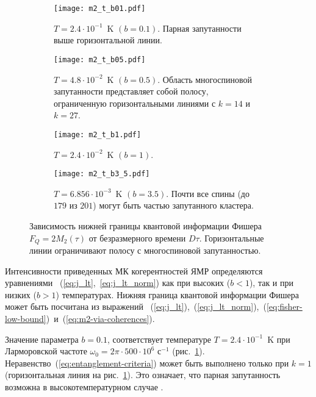 \begin{figure}[H]
  \centering
  \begin{subfigure}[t]{0.4\textwidth}
    \texttt{[image: m2\_t\_b01.pdf]}
    \caption{
      ${T=2.4\cdot10^{-1}}$~K $(b=0.1)$.
      Парная запутанности выше горизонтальной линии.
    }
    \label{fig:m2_t_b01}
  \end{subfigure}
  \hfill
  \begin{subfigure}[t]{0.4\textwidth}
    \texttt{[image: m2\_t\_b05.pdf]}
    \caption{
      ${T=4.8\cdot10^{-2}}$~K $(b=0.5)$.
      Область многоспиновой запутанности представляет собой полосу, ограниченную горизонтальными линиями с $k=14$ и $k=27$.
      }
    \label{fig:m2_t_b05}
  \end{subfigure}
  \hfill
  \begin{subfigure}[t]{0.4\textwidth}
    \texttt{[image: m2\_t\_b1.pdf]}
    \caption{
      ${T=2.4\cdot10^{-2}}$~K $(b=1)$.
    }
    \label{fig:m2_t_b1}
  \end{subfigure}
  \hfill
  \begin{subfigure}[t]{0.4\textwidth}
    \texttt{[image: m2\_t\_b3\_5.pdf]}
    \caption{
      ${T=6.856\cdot10^{-3}}$~K $(b=3.5)$.
      Почти все спины (до $179$ из $201$) могут быть частью запутанного кластера.
    }
  \label{fig:m2_t_b3.5}
  \end{subfigure}
  \caption{
    Зависимость нижней границы квантовой информации Фишера $F_Q = 2M_2(\tau)$ от безразмерного времени $D\tau$.
    Горизонтальные линии ограничивают полосу с многоспиновой запутанностью.
  }
\end{figure}

Интенсивности приведенных МК когерентностей  ЯМР определяются уравнениями ~(\ref{eq:j_lt},~\ref{eq:j_lt_norm}) как при высоких ($b < 1$), так и при низких ($b > 1$) температурах.
Нижняя граница квантовой информации Фишера может быть посчитана из выражений
~(\ref{eq:j_lt}),~(\ref{eq:j_lt_norm}),~(\ref{eq:fisher-low-bound})~и~(\ref{eq:m2-via-coherences}).

Значение параметра $b = 0.1$, соответствует температуре ${T= 2.4\cdot 10^{-1}}$~K при Ларморовской частоте $\omega_0 = 2\pi\cdot 500\cdot10^6$ с$^{-1}$ (рис.~\ref{fig:m2_t_b01}).
Неравенство~(\ref{eq:entanglement-criteria}) может быть выполнено только при $k=1$ (горизонтальная линия на рис.~\ref{fig:m2_t_b01}).
Это означает, что парная запутанность возможна в высокотемпературном случае \cite{Feldman2012}.

